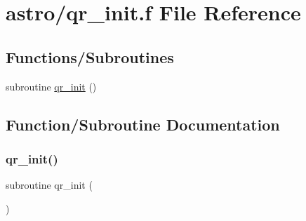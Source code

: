 \hypertarget{astro_2qr__init_8f}{}\section{astro/qr\+\_\+init.f File Reference}
\label{astro_2qr__init_8f}
\subsection*{Functions/\+Subroutines}
\begin{DoxyCompactItemize}
\item 
subroutine \hyperlink{astro_2qr__init_8f_af7240c14716ac7a794546a49beaf0d88}{qr\+\_\+init} ()
\end{DoxyCompactItemize}


\subsection{Function/\+Subroutine Documentation}
\mbox{\label{astro_2qr__init_8f_af7240c14716ac7a794546a49beaf0d88}} 
\subsubsection{\texorpdfstring{qr\+\_\+init()}{qr\_init()}}
{\footnotesize\ttfamily subroutine qr\+\_\+init (\begin{DoxyParamCaption}{ }\end{DoxyParamCaption})}

